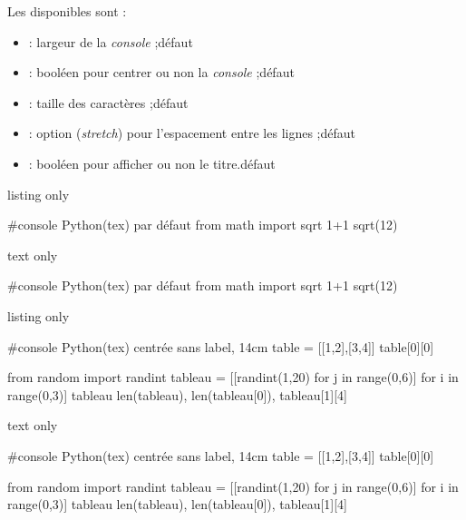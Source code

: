 \begin{cautionblock}
Les  disponibles sont :

\begin{itemize}
	\item {} : largeur de la \textit{console} ;\hfill{}défaut 
	\item {} : booléen pour centrer ou non la \textit{console} ;\hfill{}défaut 
	\item {} : taille des caractères ;\hfill{}défaut 
	\item {} : option (\textit{stretch}) pour l'espacement entre les lignes ;\hfill{}défaut 
	\item {} : booléen pour afficher ou non le titre.\hfill{}défaut 
\end{itemize}
\vspace*{-\baselineskip}\leavevmode
\end{cautionblock}

\begin{PresCodeTexPL}{listing only}
\begin{ConsolePythontex}{}
	#console Python(tex) par défaut
	from math import sqrt
	1+1
	sqrt(12)
\end{ConsolePythontex}
\end{PresCodeTexPL}

\begin{PresCodeSortiePL}{text only}
\smallskip
\begin{ConsolePythontex}{}
	#console Python(tex) par défaut
	from math import sqrt
	1+1
	sqrt(12)
\end{ConsolePythontex}
\end{PresCodeSortiePL}

\begin{PresCodeTexPL}{listing only}
\begin{ConsolePythontex}[Largeur=14cm,Label=false,Centre]{}
	#console Python(tex) centrée sans label, 14cm
	table = [[1,2],[3,4]]
	table[0][0]
	
	from random import randint
	tableau = [[randint(1,20) for j in range(0,6)] for i in range(0,3)]
	tableau
	len(tableau), len(tableau[0]), tableau[1][4]
\end{ConsolePythontex}
\end{PresCodeTexPL}

\begin{PresCodeSortiePL}{text only}
\smallskip
\begin{ConsolePythontex}[Largeur=14cm,Label=false,Centre]{}
	#console Python(tex) centrée sans label, 14cm
	table = [[1,2],[3,4]]
	table[0][0]
	
	from random import randint
	tableau = [[randint(1,20) for j in range(0,6)] for i in range(0,3)]
	tableau
	len(tableau), len(tableau[0]), tableau[1][4]
\end{ConsolePythontex}
\end{PresCodeSortiePL}

